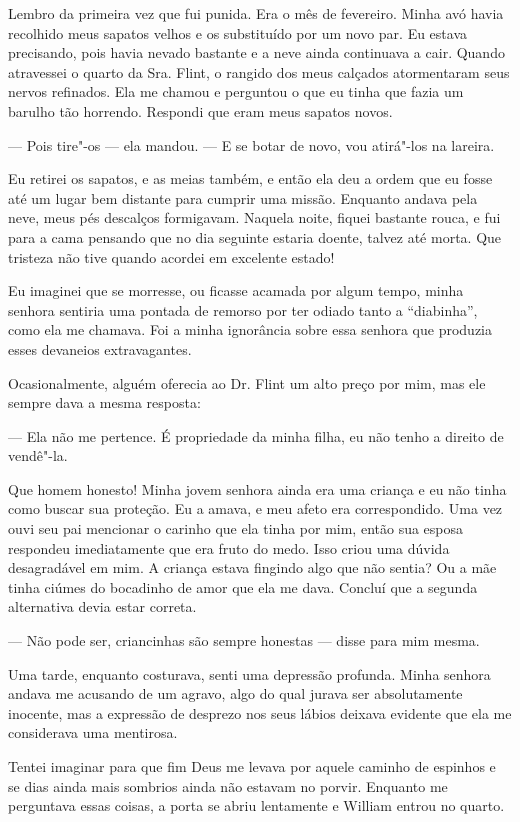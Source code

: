 Lembro da primeira vez que fui punida.
Era o mês de fevereiro. Minha avó havia recolhido meus sapatos velhos e
os substituído por um novo par. Eu estava precisando, pois havia nevado
bastante e a neve ainda continuava a cair. Quando atravessei o quarto da
Sra. Flint, o rangido dos meus calçados atormentaram seus nervos
refinados. Ela me chamou e perguntou o que eu tinha que fazia um barulho
tão horrendo. Respondi que eram meus sapatos novos.

--- Pois tire"-os --- ela mandou. --- E se botar de novo, vou atirá"-los
na lareira.

Eu retirei os sapatos, e as meias
também, e então ela deu a ordem que eu fosse até um lugar bem distante
para cumprir uma missão. Enquanto andava pela neve, meus pés descalços
formigavam. Naquela noite, fiquei bastante rouca, e fui para a cama
pensando que no dia seguinte estaria doente, talvez até morta. Que
tristeza não tive quando acordei em excelente estado!

Eu imaginei que se morresse, ou ficasse
acamada por algum tempo, minha senhora sentiria uma pontada de remorso
por ter odiado tanto a ``diabinha'', como ela me chamava. Foi a minha
ignorância sobre essa senhora que produzia esses devaneios
extravagantes.

Ocasionalmente, alguém oferecia ao Dr.
Flint um alto preço por mim, mas ele sempre dava a mesma resposta:

--- Ela não me pertence. É propriedade da minha filha, eu não tenho a
direito de vendê"-la.

Que homem honesto! Minha jovem senhora ainda era uma criança e eu não
tinha como buscar sua proteção. Eu a amava, e meu afeto era
correspondido. Uma vez ouvi seu pai mencionar o carinho que ela tinha
por mim, então sua esposa respondeu imediatamente que era fruto do medo.
Isso criou uma dúvida desagradável em mim. A criança estava fingindo
algo que não sentia? Ou a mãe tinha ciúmes do bocadinho de amor que ela
me dava. Concluí que a segunda alternativa devia estar correta.

--- Não pode ser, criancinhas são sempre honestas --- disse para mim
mesma.

Uma tarde, enquanto costurava, senti
uma depressão profunda. Minha senhora andava me acusando de um agravo,
algo do qual jurava ser absolutamente inocente, mas a expressão de
desprezo nos seus lábios deixava evidente que ela me considerava uma
mentirosa.

Tentei imaginar para que fim Deus me
levava por aquele caminho de espinhos e se dias ainda mais sombrios
ainda não estavam no porvir. Enquanto me perguntava essas coisas, a
porta se abriu lentamente e William entrou no quarto.

